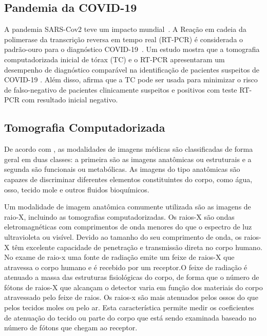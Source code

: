 \subsection{Pandemia da COVID-19 }\label{subsec:cap_fundamentos_covid_19}

A pandemia SARS-Cov2 teve um impacto mundial~\cite{WorldHealthOrganization2020CoronavirusReports}. A Reação em cadeia da polimerase da transcrição reversa em tempo real (RT-PCR) é considerada o padrão-ouro para o diagnóstico COVID-19~\cite{oliveira2020sars}. Um estudo mostra que a tomografia computadorizada inicial de tórax (TC) e o RT-PCR apresentaram um desempenho de diagnóstico comparável na identificação de pacientes suspeitos de COVID-19 \cite{he2020diagnostic}. Além disso, afirma que a TC pode ser usada para minimizar o risco de falso-negativo de pacientes clinicamente suspeitos e positivos com teste RT-PCR com resultado inicial negativo.

\subsection{Tomografia Computadorizada}\label{subsec:cap_fundamentos_tomografia}
    
De acordo com \cite{dhawan2011medical}, as modalidades de imagens médicas são classificadas de forma geral em duas classes: a primeira são as imagens anatômicas ou estruturais e a segunda são funcionais ou metabólicas. As imagens do tipo anatômicas são capazes de discriminar diferentes elementos constituintes do corpo, como água, osso, tecido mole e outros fluidos bioquímicos.

Um modalidade de imagem anatômica comumente utilizada são as imagens de raio-X, incluindo as tomografias computadorizadas. Os raios-X são ondas eletromagnéticas com comprimentos de onda menores do que o espectro de luz ultravioleta ou visível. Devido ao tamanho do seu comprimento de onda, os raios-X têm excelente capacidade de penetração e transmissão direta no corpo humano. No exame de raio-x uma fonte de radiação emite um feixe de raios-X que atravessa o corpo humano e é recebido por um receptor.O feixe de radiação é atenuado a massa das estruturas fisiológicas do corpo, de forma que o número de fótons de raios-X que alcançam o detector varia em função dos materiais do corpo atravessado pelo feixe de raios. Os raios-x são mais atenuados pelos ossos do que pelos tecidos moles ou pelo ar. Esta característica permite medir os coeficientes de atenuação do tecido ou parte do corpo que está sendo examinada baseado no número de fótons que chegam ao receptor.

